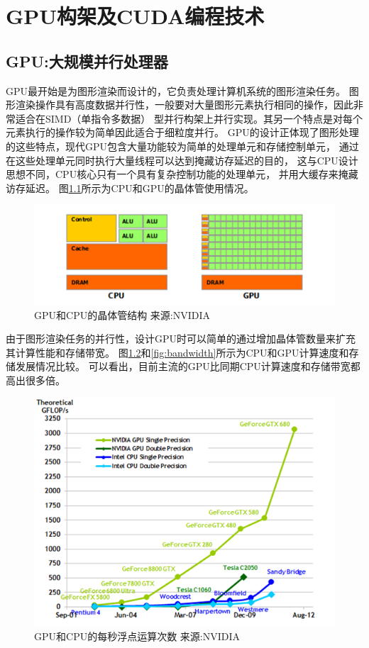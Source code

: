 \chapter{GPU构架及CUDA编程技术}
\section{GPU:大规模并行处理器}GPU最开始是为图形渲染而设计的，它负责处理计算机系统的图形渲染任务。
图形渲染操作具有高度数据并行性，一般要对大量图形元素执行相同的操作，因此非常适合在SIMD（单指令多数据）
型并行构架上并行实现。其另一个特点是对每个元素执行的操作较为简单因此适合于细粒度并行。
GPU的设计正体现了图形处理的这些特点，现代GPU包含大量功能较为简单的处理单元和存储控制单元，
通过在这些处理单元同时执行大量线程可以达到掩藏访存延迟的目的，
这与CPU设计思想不同，CPU核心只有一个具有复杂控制功能的处理单元，
并用大缓存来掩藏访存延迟。
图\ref{fig:gpu_cpu_arch}所示为CPU和GPU的晶体管使用情况。
\begin{figure}[htpb]
  \centering
  \includegraphics[]{img/gpu_cpu_arch}
  \caption{GPU和CPU的晶体管结构 \footnotesize 来源:NVIDIA}
  \label{fig:gpu_cpu_arch}
\end{figure}
由于图形渲染任务的并行性，设计GPU时可以简单的通过增加晶体管数量来扩充其计算性能和存储带宽。
图\ref{fig:performance}和\ref{fig:bandwidth}所示为CPU和GPU计算速度和存储发展情况比较。
可以看出，目前主流的GPU比同期CPU计算速度和存储带宽都高出很多倍。

\begin{figure}[htb]
  \centering
  \includegraphics[]{img/performance}
  \caption{GPU和CPU的每秒浮点运算次数 \footnotesize 来源:NVIDIA}
  \label{fig:performance}
\end{figure}

